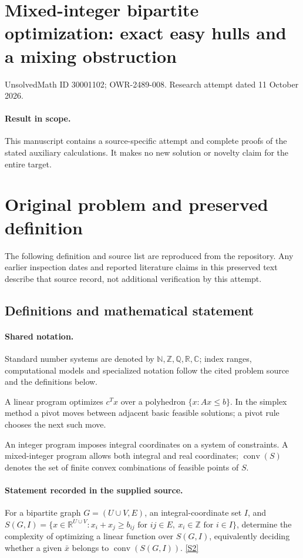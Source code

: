 \documentclass[11pt]{article}
\begin{document}
\section*{Mixed-integer bipartite optimization: exact easy hulls and a mixing obstruction}
\noindent UnsolvedMath ID 30001102; OWR-2489-008. Research attempt dated 11 October 2026.
\paragraph{Result in scope.}This manuscript contains a source-specific attempt and complete proofs of the stated auxiliary calculations. It makes no new solution or novelty claim for the entire target.
\section{Original problem and preserved definition}
The following definition and source list are reproduced from the repository. Any earlier inspection dates and reported literature claims in this preserved text describe that source record, not additional verification by this attempt.
\subsection{Definitions and mathematical statement}

\paragraph{Shared notation.}Standard number systems are denoted by $\mathbb N,\mathbb Z,\mathbb Q,\mathbb R,\mathbb C$; index ranges, computational models and specialized notation follow the cited problem source and the definitions below.


A linear program optimizes $c^Tx$ over a polyhedron $\{x:Ax\leq b\}$. In the simplex method a pivot moves between adjacent basic feasible solutions; a pivot rule chooses the next such move.

An integer program imposes integral coordinates on a system of constraints. A mixed-integer program allows both integral and real coordinates; $\operatorname{conv}(S)$ denotes the set of finite convex combinations of feasible points of $S$.
\paragraph{Statement recorded in the supplied source.}
For a bipartite graph $G=(U\cup V,E)$, an integral-coordinate set $I$, and $S(G,I)=\{x\in\mathbb{R}^{U\cup V}:x_i+x_j\geq b_{ij}\text{ for }ij\in E,\ x_i\in\mathbb{Z}\text{ for }i\in I\}$, determine the complexity of optimizing a linear function over $S(G,I)$, equivalently deciding whether a given $\bar{x}$ belongs to $\operatorname{conv}(S(G,I))$. \href{https://doi.org/10.4171/owr/2008/51}{[S2]}
\end{document}
